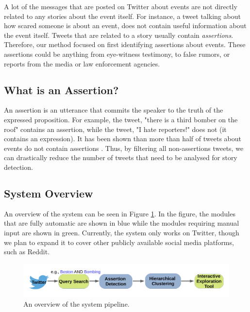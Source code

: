 \documentclass[letterpaper]{article}
\begin{document}
A lot of the messages that are posted on Twitter about events are not directly related to any stories about the event itself. For instance, a tweet talking about how scared someone is about an event, does not contain useful information about the event itself. Tweets that are related to a story usually contain \emph{assertions}. Therefore, our method focused on first identifying assertions about events. These assertions could be anything from eye-witness testimony, to false rumors, or reports from the media or law enforcement agencies. %







\subsection{What is an Assertion?}
An assertion is an utterance that commits the speaker to the truth of the expressed proposition. For example, the tweet, "there is a third bomber on the roof" contains an assertion, while the tweet, "I hate reporters!" does not (it contains an expression). %
It has been shown than more than half of tweets about events do not contain assertions \cite{vosoughi_act_2016}. Thus, by filtering all non-assertions tweets, we can drastically reduce the number of tweets that need to be analysed for story detection.






\subsection{System Overview}
An overview of the system can be seen in Figure \ref{fig:pipeline}. In the figure, the modules that are fully automatic are shown in blue while the modules requiring manual input are shown in green. Currently, the system only works on Twitter, though we plan to expand it to cover other publicly available social media platforms, such as Reddit.

\begin{figure}[h]
\centering
\includegraphics[width=1.\columnwidth]{pipeline1_2.pdf}
\caption{An overview of the system pipeline.}
\label{fig:pipeline}
\end{figure}
\end{document}
